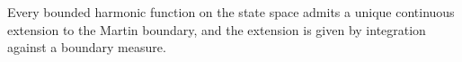 Every bounded harmonic function on the state space admits a unique continuous extension to the Martin boundary, and the extension is given by integration against a boundary measure.